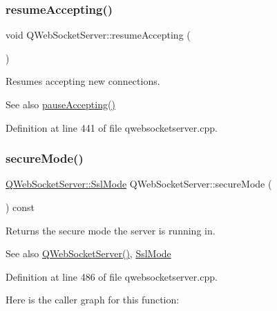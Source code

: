 \subsubsection{\texorpdfstring{resume\+Accepting()}{resumeAccepting()}}
{\footnotesize\ttfamily void Q\+Web\+Socket\+Server\+::resume\+Accepting (\begin{DoxyParamCaption}{ }\end{DoxyParamCaption})}

Resumes accepting new connections. \begin{DoxySeeAlso}{See also}
\mbox{\hyperlink{class_q_web_socket_server_abebb5c4066427590c3d4aacecfe51567}{pause\+Accepting()}} 
\end{DoxySeeAlso}


Definition at line 441 of file qwebsocketserver.\+cpp.

\mbox{\label{class_q_web_socket_server_a5f5e751ea45b35bd67c9447d0b41aa73}} 
\subsubsection{\texorpdfstring{secure\+Mode()}{secureMode()}}
{\footnotesize\ttfamily \mbox{\hyperlink{class_q_web_socket_server_a07ce392fd4fa351746e48b00428366b8}{Q\+Web\+Socket\+Server\+::\+Ssl\+Mode}} Q\+Web\+Socket\+Server\+::secure\+Mode (\begin{DoxyParamCaption}{ }\end{DoxyParamCaption}) const}

Returns the secure mode the server is running in.

\begin{DoxySeeAlso}{See also}
\mbox{\hyperlink{class_q_web_socket_server_a37bfbbb8ec6c171fd2b6b04b556dfc6d}{Q\+Web\+Socket\+Server()}}, \mbox{\hyperlink{class_q_web_socket_server_a07ce392fd4fa351746e48b00428366b8}{Ssl\+Mode}} 
\end{DoxySeeAlso}


Definition at line 486 of file qwebsocketserver.\+cpp.

Here is the caller graph for this function\+:
\mbox{\label{class_q_web_socket_server_a8c9df0e8ad799e0ea633db852f37497a}} 
